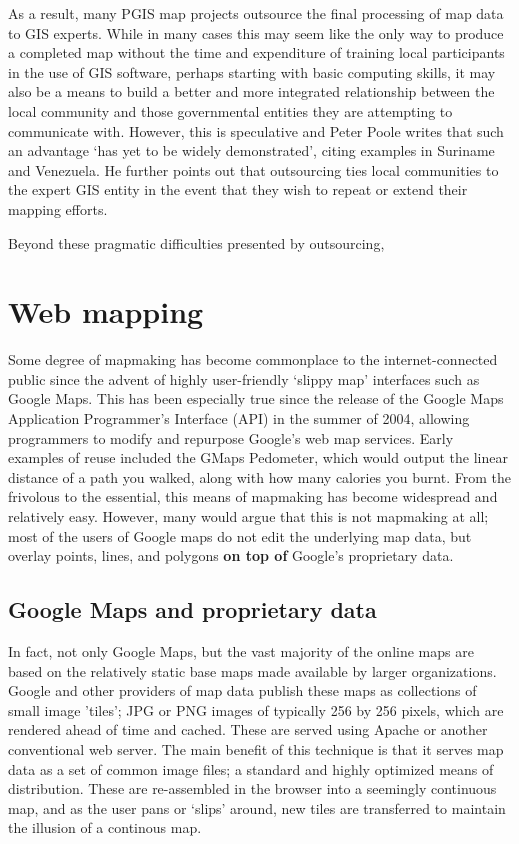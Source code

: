 \documentclass[11pt]{report}
\begin{document}
As a result, many PGIS map projects outsource the final processing of map data to GIS experts. While in many cases this may seem like the only way to produce a completed map without the time and expenditure of training local participants in the use of GIS software, perhaps starting with basic computing skills, it may also be a means to build a better and more integrated relationship between the local community and those governmental entities they are attempting to communicate with. However, this is speculative and Peter Poole writes that such an advantage `has yet to be widely demonstrated', citing examples in Suriname and Venezuela. He further points out that outsourcing ties local communities to the expert GIS entity in the event that they wish to repeat or extend their mapping efforts. \cite{poole2006there}

Beyond these pragmatic difficulties presented by outsourcing,  

\section{Web mapping}

Some degree of mapmaking has become commonplace to the internet-connected public since the advent of highly user-friendly `slippy map' interfaces such as Google Maps. This has been especially true since the release of the Google Maps Application Programmer's Interface (API) in the summer of 2004, allowing programmers to modify and repurpose Google's web map services.  Early examples of reuse included the GMaps Pedometer, which would output the linear distance of a path you walked, along with how many calories you burnt. \cite{gibson2006google} From the frivolous to the essential, this means of mapmaking has become widespread and relatively easy. However, many would argue that this is not mapmaking at all; most of the users of Google maps do not edit the underlying map data, but overlay points, lines, and polygons \textbf{on top of} Google's proprietary data.

\subsection{Google Maps and proprietary data}

In fact, not only Google Maps, but the vast majority of the online maps are based on the relatively static base maps made available by larger organizations. Google and other providers of map data publish these maps as collections of small image 'tiles'; JPG or PNG images of typically 256 by 256 pixels, which are rendered ahead of time and cached. These are served using Apache or another conventional web server. The main benefit of this technique is that it serves map data as a set of common image files; a standard and highly optimized means of distribution. These are re-assembled in the browser into a seemingly continuous map, and as the user pans or `slips' around, new tiles are transferred to maintain the illusion of a continous map.
\end{document}
